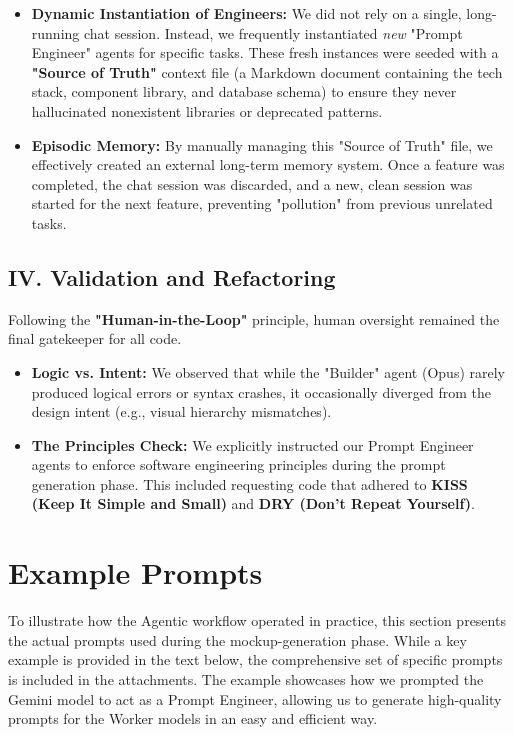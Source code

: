 \documentclass[a4paper,12pt]{report}
\begin{document}
\begin{itemize}
    \item \textbf{Dynamic Instantiation of Engineers:} We did not rely on a single, long-running chat session. Instead, we frequently instantiated \textit{new} "Prompt Engineer" agents for specific tasks. These fresh instances were seeded with a \textbf{"Source of Truth"} context file (a Markdown document containing the tech stack, component library, and database schema) to ensure they never hallucinated nonexistent libraries or deprecated patterns.
    \item \textbf{Episodic Memory:} By manually managing this "Source of Truth" file, we effectively created an external long-term memory system. Once a feature was completed, the chat session was discarded, and a new, clean session was started for the next feature, preventing "pollution" from previous unrelated tasks.
\end{itemize}

\subsection*{IV. Validation and Refactoring}

Following the \textbf{"Human-in-the-Loop"} principle, human oversight remained the final gatekeeper for all code.

\begin{itemize}
    \item \textbf{Logic vs. Intent:} We observed that while the "Builder" agent (Opus) rarely produced logical errors or syntax crashes, it occasionally diverged from the design intent (e.g., visual hierarchy mismatches).
    \item \textbf{The Principles Check:} We explicitly instructed our Prompt Engineer agents to enforce software engineering principles during the prompt generation phase. This included requesting code that adhered to \textbf{KISS (Keep It Simple and Small)} and \textbf{DRY (Don't Repeat Yourself)}.
\end{itemize}

\section{Example Prompts}
To illustrate how the Agentic workflow operated in practice, this section presents the actual prompts used during the mockup-generation phase. While a key example is provided in the text below, the comprehensive set of specific prompts is included in the attachments. The example showcases how we prompted the Gemini model to act as a Prompt Engineer, allowing us to generate high-quality prompts for the Worker models in an easy and efficient way.
\end{document}
